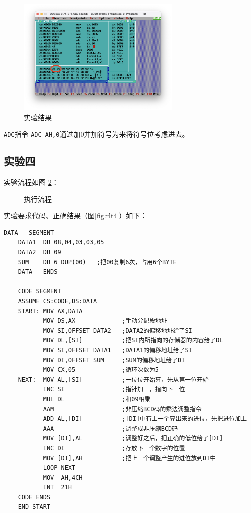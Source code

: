 \documentclass[11pt]{SEU-Digital-Report}
\begin{document}
\begin{figure}[htbp]
    \centering
    \includegraphics[width=0.7\textwidth]{fig/rlt3.png}
    \caption{实验结果}
    \label{fig:rlt3}
\end{figure}

\begin{note}{\texttt{ADC}指令}{}
    \texttt{ADC AH,0}通过加0并加符号为来将符号位考虑进去。
\end{note}

\subsection{实验四}
实验流程如图 \ref{fig:exp34}：
\begin{figure}[hbpt]
    \centering
    
    \caption{执行流程}
    \label{fig:exp34}
\end{figure}

实验要求代码、正确结果（图\ref{fig:rlt4}）如下：
\begin{lstlisting}[language={[x86masm]Assembler},title=exp34.asm]
    DATA   SEGMENT
    DATA1  DB 08,04,03,03,05
    DATA2  DB 09
    SUM    DB 6 DUP(00)   ;把00复制6次，占用6个BYTE
    DATA   ENDS 
      
    CODE SEGMENT
    ASSUME CS:CODE,DS:DATA
    START: MOV AX,DATA          
           MOV DS,AX             ;手动分配段地址
           MOV SI,OFFSET DATA2   ;DATA2的偏移地址给了SI
           MOV DL,[SI]           ;把SI内所指向的存储器的内容给了DL
           MOV SI,OFFSET DATA1   ;DATA1的偏移地址给了SI
           MOV DI,OFFSET SUM     ;SUM的偏移地址给了DI
           MOV CX,05             ;循环次数为5
    NEXT:  MOV AL,[SI]           ;一位位开始算，先从第一位开始
           INC SI                ;指针加一，指向下一位
           MUL DL                ;和09相乘
           AAM                   ;非压缩BCD码的乘法调整指令
           ADD AL,[DI]           ;[DI]中有上一个算出来的进位，先把进位加上
           AAA                   ;调整成非压缩BCD码
           MOV [DI],AL           ;调整好之后，把正确的低位给了[DI]
           INC DI                ;存放下一个数字的位置
           MOV [DI],AH           ;把上一个调整产生的进位放到DI中
           LOOP NEXT
           MOV  AH,4CH
           INT  21H
    CODE ENDS
    END START     
\end{lstlisting}
\end{document}
